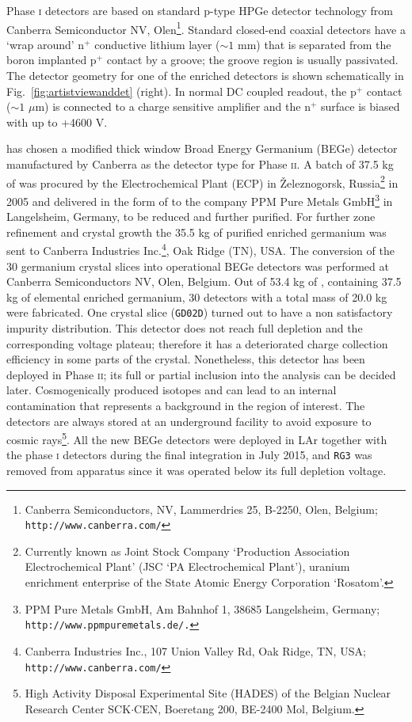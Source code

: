 Phase \textsc{i} detectors are based on standard p-type HPGe detector technology from Canberra Semiconductor NV, Olen\footnote{Canberra Semiconductors, NV, Lammerdries 25, B-2250, Olen, Belgium; \texttt{http://www.canberra.com/}}. Standard closed-end coaxial detectors have a `wrap around' $\text{n}^+$ conductive lithium layer ($\sim1$ mm) that is separated from the boron implanted $\text{p}^+$ contact by a groove; the groove region is usually passivated. The detector geometry for one of the enriched detectors is shown schematically in Fig.~\ref{fig:artistviewanddet} (right). In normal DC coupled readout, the p$^+$ contact ($\sim1$ $\mu$m) is connected to a charge sensitive amplifier and the n$^+$ surface is biased with up to +4600 V.

{\gerda} has chosen a modified thick window Broad Energy Germanium (BEGe) detector manufactured by Canberra as the detector type for Phase \textsc{ii}. A batch of 37.5 kg of  was procured by the Electrochemical Plant (ECP) in Železnogorsk, Russia\footnote{Currently known as Joint Stock Company `Production Association Electrochemical Plant' (JSC `PA Electrochemical Plant'), uranium enrichment enterprise of the State Atomic Energy Corporation `Rosatom'.} in 2005 and delivered in the form of  to the company PPM Pure Metals GmbH\footnote{PPM Pure Metals GmbH, Am Bahnhof 1, 38685 Langelsheim, Germany; \texttt{http://www.ppmpuremetals.de/.}} in Langelsheim, Germany, to be reduced and further purified. For further zone refinement and crystal growth the 35.5 kg of purified enriched germanium was sent to Canberra Industries Inc.\footnote{Canberra Industries Inc., 107 Union Valley Rd, Oak Ridge, TN, USA; \texttt{http://www.canberra.com/}}, Oak Ridge (TN), USA. The conversion of the 30 germanium crystal slices into operational BEGe detectors was performed at Canberra Semiconductors NV, Olen, Belgium. Out of 53.4 kg of , containing 37.5 kg of elemental enriched germanium, 30 detectors with a total mass of 20.0 kg were fabricated. One crystal slice (\texttt{GD02D}) turned out to have a non satisfactory impurity distribution. This detector does not reach full depletion and the corresponding voltage plateau; therefore it has a deteriorated charge collection efficiency in some parts of the crystal. Nonetheless, this detector has been deployed in {\gerda} Phase \textsc{ii}; its full or partial inclusion into the analysis can be decided later. Cosmogenically produced isotopes  and  can lead to an internal contamination that represents a background in the region of interest. The detectors are always stored at an underground facility to avoid exposure to cosmic rays\footnote{High Activity Disposal Experimental Site (HADES) of the Belgian Nuclear Research Center SCK$\cdot$CEN, Boeretang 200, BE-2400 Mol, Belgium.}. All the new BEGe detectors were deployed in LAr together with the phase \textsc{i} detectors during the final integration in July 2015, and \texttt{RG3} was removed from apparatus since it was operated below its full depletion voltage.

